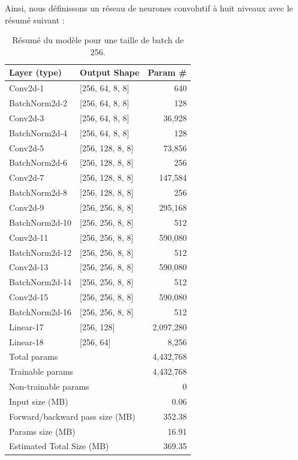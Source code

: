Ainsi, nous définissons un réseau de neurones convolutif à huit niveaux avec le résumé suivant :
\begin{table}[ht]
    \centering
    \caption{Résumé du modèle pour une taille de batch de 256.}
    \begin{tabular}{@{}llr@{}} %
    \toprule
    \textbf{Layer (type)} & \textbf{Output Shape} & \textbf{Param \#} \\
    \midrule
    Conv2d-1 & [256, 64, 8, 8] & 640 \\
    BatchNorm2d-2 & [256, 64, 8, 8] & 128 \\
    Conv2d-3 & [256, 64, 8, 8] & 36,928 \\
    BatchNorm2d-4 & [256, 64, 8, 8] & 128 \\
    Conv2d-5 & [256, 128, 8, 8] & 73,856 \\
    BatchNorm2d-6 & [256, 128, 8, 8] & 256 \\
    Conv2d-7 & [256, 128, 8, 8] & 147,584 \\
    BatchNorm2d-8 & [256, 128, 8, 8] & 256 \\
    Conv2d-9 & [256, 256, 8, 8] & 295,168 \\
    BatchNorm2d-10 & [256, 256, 8, 8] & 512 \\
    Conv2d-11 & [256, 256, 8, 8] & 590,080 \\
    BatchNorm2d-12 & [256, 256, 8, 8] & 512 \\
    Conv2d-13 & [256, 256, 8, 8] & 590,080 \\
    BatchNorm2d-14 & [256, 256, 8, 8] & 512 \\
    Conv2d-15 & [256, 256, 8, 8] & 590,080 \\
    BatchNorm2d-16 & [256, 256, 8, 8] & 512 \\
    Linear-17 & [256, 128] & 2,097,280 \\
    Linear-18 & [256, 64] & 8,256 \\
    \midrule
    \multicolumn{2}{l}{Total params} & 4,432,768 \\
    \multicolumn{2}{l}{Trainable params} & 4,432,768 \\
    \multicolumn{2}{l}{Non-trainable params} & 0 \\
    \midrule
    \multicolumn{2}{l}{Input size (MB)} & 0.06 \\
    \multicolumn{2}{l}{Forward/backward pass size (MB)} & 352.38 \\
    \multicolumn{2}{l}{Params size (MB)} & 16.91 \\
    \multicolumn{2}{l}{Estimated Total Size (MB)} & 369.35 \\
    \bottomrule
    \end{tabular}
\end{table}

